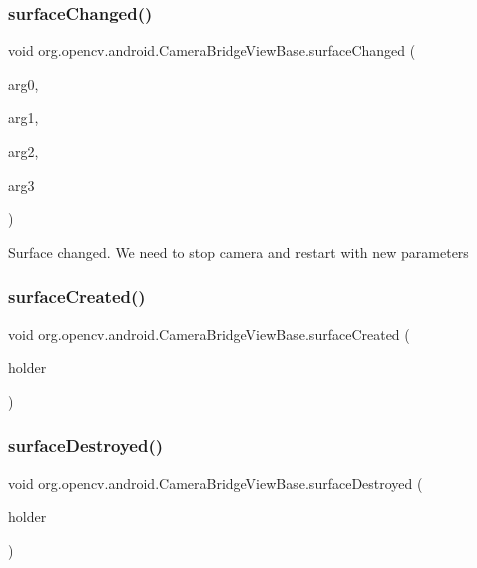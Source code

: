 \subsubsection{\texorpdfstring{surface\+Changed()}{surfaceChanged()}}
{\footnotesize\ttfamily void org.\+opencv.\+android.\+Camera\+Bridge\+View\+Base.\+surface\+Changed (\begin{DoxyParamCaption}\item[{Surface\+Holder}]{arg0,  }\item[{int}]{arg1,  }\item[{int}]{arg2,  }\item[{int}]{arg3 }\end{DoxyParamCaption})}

Surface changed. We need to stop camera and restart with new parameters \mbox{\label{classorg_1_1opencv_1_1android_1_1_camera_bridge_view_base_a03e25a12d1621a9e65c8f08702c22de9}} 
\subsubsection{\texorpdfstring{surface\+Created()}{surfaceCreated()}}
{\footnotesize\ttfamily void org.\+opencv.\+android.\+Camera\+Bridge\+View\+Base.\+surface\+Created (\begin{DoxyParamCaption}\item[{Surface\+Holder}]{holder }\end{DoxyParamCaption})}

\mbox{\label{classorg_1_1opencv_1_1android_1_1_camera_bridge_view_base_a547f6c285f2a85ecd7ee3de772cf0d63}} 
\subsubsection{\texorpdfstring{surface\+Destroyed()}{surfaceDestroyed()}}
{\footnotesize\ttfamily void org.\+opencv.\+android.\+Camera\+Bridge\+View\+Base.\+surface\+Destroyed (\begin{DoxyParamCaption}\item[{Surface\+Holder}]{holder }\end{DoxyParamCaption})}



